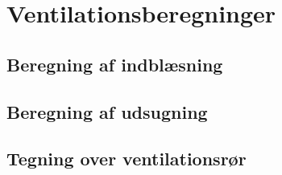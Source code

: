\section{Ventilationsberegninger}
\label{sec:ventilationsberegninger}

\subsection{Beregning af indblæsning}
\label{sub:indblaesning_beregning}


\subsection{Beregning af udsugning}
\label{sub:udsugning_beregning}

\subsection{Tegning over ventilationsrør} \label{fig:tegning_ventr}